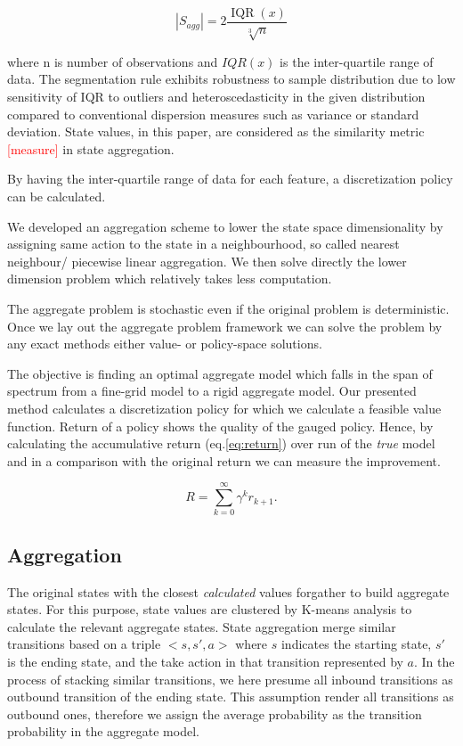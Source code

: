 \documentclass{article}
\begin{document}
    \begin{equation}
        |S_{agg}| = 2 \frac{\operatorname{IQR}(x)}{\sqrt[3]{n}}
    \end{equation}

    where n is number of observations and $IQR(x)$ is the inter-quartile range of data.
    The segmentation rule exhibits robustness to sample distribution due to low sensitivity of IQR to outliers and
    heteroscedasticity in the given distribution compared to conventional dispersion measures such as variance or
    standard deviation.
    State values, in this paper, are considered as the similarity metric \textcolor{red}{[measure]} in state
    aggregation.

    By having the inter-quartile range of data for each feature, a discretization policy can be calculated.

    We developed an aggregation scheme to lower the state space dimensionality by assigning same action to the state
    in a neighbourhood, so called nearest neighbour/ piecewise linear aggregation.
    We then solve directly the lower dimension problem which relatively takes less computation.

    The aggregate problem is stochastic even if the original problem is deterministic.
    Once we lay out the aggregate problem framework we can solve the problem by any exact methods either value- or
    policy-space solutions.

    The objective is finding an optimal aggregate model which falls in the span of spectrum from a fine-grid model
    to a rigid aggregate model.
    Our presented method calculates a discretization policy for which we calculate a feasible value function.
    Return of a policy shows the quality of the gauged policy.
    Hence, by calculating the accumulative return (eq.\ref{eq:return}) over run of the \textit{true} model and in a
    comparison with the original return we can measure the improvement.

    \begin{equation}
        R = \sum_{k=0}^{\infty} \gamma^{k} r_{k+1}. \label{eq:return}
    \end{equation}

    \subsection{Aggregation}
    The original states with the closest \textit{calculated} values forgather to build aggregate states.
    For this purpose, state values are clustered by K-means analysis to calculate the relevant aggregate states.
    State aggregation merge similar transitions based on a triple $<s, s', a>$ where $s$ indicates the starting state,
    $s'$ is the ending state, and the take action in that transition represented by $a$.
    In the process of stacking similar transitions, we here presume all inbound transitions as outbound transition of
    the ending state.
    This assumption render all transitions as outbound ones, therefore we assign the average probability as the
    transition probability in the aggregate model.
\end{document}
